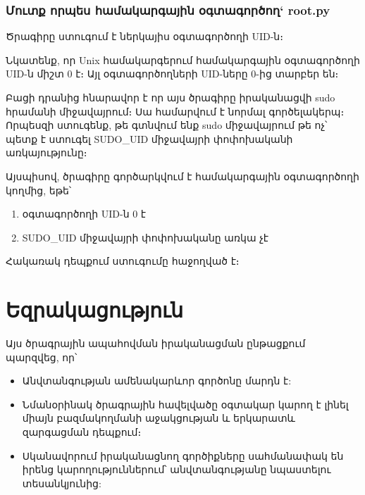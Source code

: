 \documentclass[12pt]{article}
\begin{document}
\begin{sloppypar}
\subsubsection{Մուտք որպես համակարգային օգտագործող` root.py}


Ծրագիրը ստուգում է ներկայիս օգտագործողի UID-ն։

Նկատենք, որ Unix համակարգերում համակարգային օգտագործողի UID-ն միշտ 0 է։
Այլ օգտագործողների UID-ները 0-ից տարբեր են։

Բացի դրանից հնարավոր է որ այս ծրագիրը իրականացվի sudo հրամանի միջավայրում։
Սա համարվում է նորմալ գործելակերպ։ Որպեսզի ստուգենք, թե գտնվում ենք sudo
միջավայրում թե ոչ՝ պետք է ստուգել SUDO\_UID միջավայրի փոփոխականի
առկայությունը։

Այսպիսով, ծրագիրը գործարկվում է համակարգային օգտագործողի կողմից, եթե՝
\begin{enumerate}
\item օգտագործողի UID-ն 0 է
\item SUDO\_UID միջավայրի փոփոխականը առկա չէ
\end{enumerate}

Հակառակ դեպքում ստուգումը հաջողված է։


\newpage
\section{Եզրակացություն}

Այս ծրագրային ապահովման իրականացման ընթացքում պարզվեց, որ՝

\begin{itemize}
\item Անվտանգության ամենակարևոր գործոնը մարդն է:
\item Նմանօրինակ ծրագրային հավելվածը օգտակար կարող է
    լինել միայն բազմակողմանի աջակցության և երկարատև զարգացման
    դեպքում։
\item Սկանավորում իրականացնող գործիքները սահմանափակ են
    իրենց կարողություններում՝ անվտանգությանը նպաստելու
    տեսանկյունից:
\end{itemize}


\newpage

\end{sloppypar}
\end{document}
